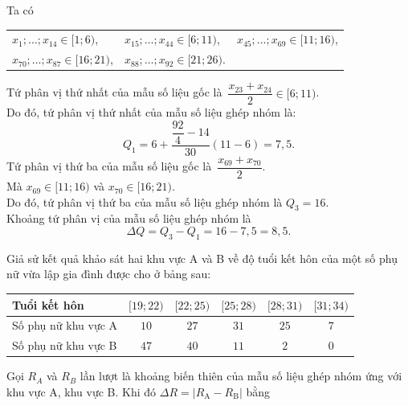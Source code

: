 \begin{ex}
{		Ta có
		\begin{center}
			\begin{tabular}{lll}
				$x_1;\ldots;x_{14}\in  [1; 6)$,&
				$x_{15};\ldots;x_{44}\in  [6; 11)$,&
				$x_{45};\ldots;x_{69}\in  [11; 16)$,\\
				$x_{70};\ldots;x_{87}\in  [16; 21)$,&
				$x_{88};\ldots;x_{92}\in  [21; 26)$.&
			\end{tabular}
		\end{center}
		Tứ phân vị thứ nhất của mẫu số liệu gốc là $\dfrac{x_{23}+x_{24}}{2}\in [6; 11)$. \\
		Do đó, tứ phân vị thứ nhất của mẫu số liệu ghép nhóm là:
		$$Q_1=6+\dfrac{\dfrac{92}{4}-14}{30}\left(11-6\right)=7{,}5.$$
		Tứ phân vị thứ ba của mẫu số liệu gốc là $\dfrac{x_{69}+x_{70}}{2}$.\\
		Mà $x_{69}\in [11; 16)$ và $x_{70}\in [16; 21)$. \\
		Do đó, tứ phân vị thứ ba của mẫu số liệu ghép nhóm là $Q_3 = 16$.\\
		Khoảng tứ phân vị của mẫu số liệu ghép nhóm là
		$$\Delta Q = Q_3 - Q_1 = 16 - 7{,}5 = 8{,}5.$$
	}
\end{ex}

\begin{ex}%
	Giả sử kết quả khảo sát hai khu vực A và B về độ tuổi kết hôn của một số phụ nữ vừa lập gia đình được cho ở bảng sau:
	\begin{center}
		\begin{tabular}{|l|c|c|c|c|c|}
			\hline
			Tuổi kết hôn & $[19; 22)$ & $[22; 25)$ & $[25; 28)$ & $[28; 31)$ & $[31; 34)$ \\
			\hline
			Số phụ nữ khu vực A & $10$ & $27$ & $31$ & $25$ & $7$ \\
			\hline
			Số phụ nữ khu vực B & $47$ & $40$ & $11$ & $2$ & $0$ \\
			\hline
		\end{tabular}
	\end{center}
Gọi $R_A$ và $R_B$ lần lượt là khoảng biến thiên của mẫu số liệu ghép nhóm ứng với khu vực A, khu vực B. Khi đó $\Delta R=|R_\text{A}-R_\text{B}|$ bằng
\end{ex}

